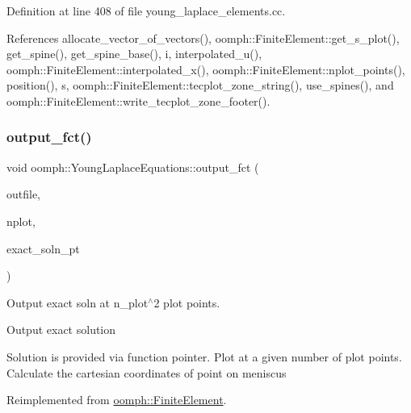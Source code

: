 Definition at line 408 of file young\+\_\+laplace\+\_\+elements.\+cc.



References allocate\+\_\+vector\+\_\+of\+\_\+vectors(), oomph\+::\+Finite\+Element\+::get\+\_\+s\+\_\+plot(), get\+\_\+spine(), get\+\_\+spine\+\_\+base(), i, interpolated\+\_\+u(), oomph\+::\+Finite\+Element\+::interpolated\+\_\+x(), oomph\+::\+Finite\+Element\+::nplot\+\_\+points(), position(), s, oomph\+::\+Finite\+Element\+::tecplot\+\_\+zone\+\_\+string(), use\+\_\+spines(), and oomph\+::\+Finite\+Element\+::write\+\_\+tecplot\+\_\+zone\+\_\+footer().

\mbox{\label{classoomph_1_1YoungLaplaceEquations_a7938b426803efb21be5d7b7e78be16c5}} 
\subsubsection{\texorpdfstring{output\+\_\+fct()}{output\_fct()}\hspace{0.1cm}{\footnotesize\ttfamily [1/2]}}
{\footnotesize\ttfamily void oomph\+::\+Young\+Laplace\+Equations\+::output\+\_\+fct (\begin{DoxyParamCaption}\item[{std\+::ostream \&}]{outfile,  }\item[{const unsigned \&}]{nplot,  }\item[{\hyperlink{classoomph_1_1FiniteElement_a690fd33af26cc3e84f39bba6d5a85202}{Finite\+Element\+::\+Steady\+Exact\+Solution\+Fct\+Pt}}]{exact\+\_\+soln\+\_\+pt }\end{DoxyParamCaption})\hspace{0.3cm}{\ttfamily [virtual]}}



Output exact soln at n\+\_\+plot$^\wedge$2 plot points. 

Output exact solution

Solution is provided via function pointer. Plot at a given number of plot points. Calculate the cartesian coordinates of point on meniscus 

Reimplemented from \hyperlink{classoomph_1_1FiniteElement_a22b695c714f60ee6cd145be348042035}{oomph\+::\+Finite\+Element}.



